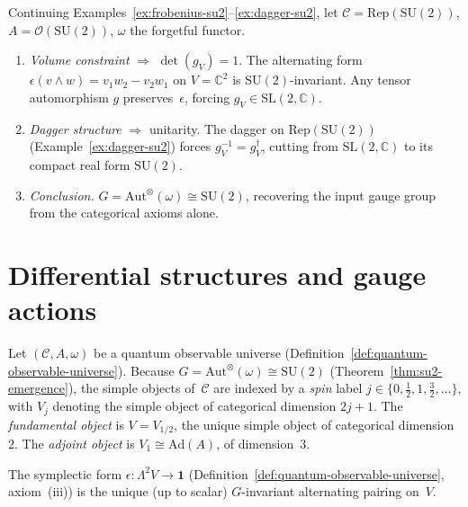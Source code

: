 \begin{example}
\label{ex:su2-emergence}
Continuing Examples~\ref{ex:frobenius-su2}--\ref{ex:dagger-su2}, let
$\mathcal{C} = \mathrm{Rep}(\mathrm{SU}(2))$,
$A = \mathcal{O}(\mathrm{SU}(2))$, $\omega$ the forgetful functor.
\begin{enumerate}
  \item \emph{Volume constraint} $\Rightarrow$ $\det(g_V) = 1$.\;
        The alternating form $\epsilon(v \wedge w) = v_1 w_2 - v_2 w_1$
        on $V = \mathbb{C}^2$ is $\mathrm{SU}(2)$-invariant.  Any tensor
        automorphism $g$ preserves~$\epsilon$, forcing
        $g_V \in \mathrm{SL}(2, \mathbb{C})$.
  \item \emph{Dagger structure} $\Rightarrow$ unitarity.\;
        The dagger on $\mathrm{Rep}(\mathrm{SU}(2))$
        (Example~\ref{ex:dagger-su2}) forces
        $g_V^{-1} = g_V^{\dagger}$, cutting from
        $\mathrm{SL}(2, \mathbb{C})$ to its compact real form
        $\mathrm{SU}(2)$.
  \item \emph{Conclusion.}\;
        $G = \mathrm{Aut}^{\otimes}(\omega) \cong \mathrm{SU}(2)$,
        recovering the input gauge group from the categorical axioms
        alone.
\end{enumerate}
\end{example}


\section{Differential structures and gauge actions}
\label{sec:differential-structures}

\begin{definition}
\label{def:spin-labels}
\leanok
Let $(\mathcal{C}, A, \omega)$ be a quantum observable universe
(Definition~\ref{def:quantum-observable-universe}).  Because
$G = \mathrm{Aut}^{\otimes}(\omega) \cong \mathrm{SU}(2)$
(Theorem~\ref{thm:su2-emergence}), the simple objects of~$\mathcal{C}$
are indexed by a \emph{spin} label $j \in \{0, \tfrac12, 1,
\tfrac32, \ldots\}$, with $V_j$ denoting the simple object of
categorical dimension $2j + 1$.
The \emph{fundamental object} is $V = V_{1/2}$, the unique simple object
of categorical dimension~$2$.  The \emph{adjoint object} is
$V_1 \cong \mathrm{Ad}(A)$, of dimension~$3$.

The symplectic form $\epsilon \colon \Lambda^2 V \to \mathbf{1}$
(Definition~\ref{def:quantum-observable-universe}, axiom~(iii)) is the
unique (up to scalar) $G$-invariant alternating pairing on~$V$.
\end{definition}

